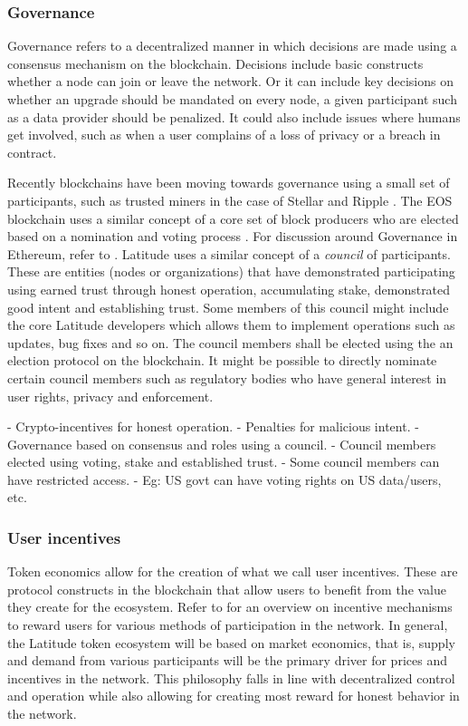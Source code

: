 \subsubsection{Governance}
Governance refers to a decentralized manner in which decisions are made using a consensus mechanism on the blockchain.
Decisions include basic constructs whether a node can join or leave the network. Or it can include key decisions on
whether an upgrade should be mandated on every node, a given participant such as a data provider should be penalized. It
could also include issues where humans get involved, such as when a user complains of a loss of privacy or a breach in
contract.

Recently blockchains have been moving towards governance using a small set of participants, such as trusted miners in
the case of Stellar and Ripple \cite{stellar_gateway}. The EOS blockchain uses a similar concept of a core set of block
producers who are elected based on a nomination and voting process \cite{eos_producers}. For discussion around
Governance in Ethereum, refer to \cite{buterin_gov}. Latitude uses a similar concept of a {\em council} of participants.
These are entities (nodes or organizations) that have demonstrated participating using earned trust through honest
operation, accumulating stake, demonstrated good intent and establishing trust. Some members of this council might
include the core Latitude developers which allows them to implement operations such as updates, bug fixes and so on. The
council members shall be elected using the an election protocol on the blockchain. It might be possible to directly
nominate certain council members such as regulatory bodies who have general interest in user rights, privacy and
enforcement. 

 - Crypto-incentives for honest operation.
 - Penalties for malicious intent.
 - Governance based on consensus and roles using a council.
 - Council members elected using voting, stake and established trust.
 - Some council members can have restricted access.
 - Eg: US govt can have voting rights on US data/users, etc.

\subsubsection{User incentives}
Token economics allow for the creation of what we call user incentives. These are protocol constructs in the blockchain
that allow users to benefit from the value they create for the ecosystem. Refer to \cite{token_ecos} for an overview on
incentive mechanisms to reward users for various methods of participation in the network. In general, the Latitude token
ecosystem will be based on market economics, that is, supply and demand from various participants will be the primary
driver for prices and incentives in the network. This philosophy falls in line with decentralized control and operation
while also allowing for creating most reward for honest behavior in the network.

